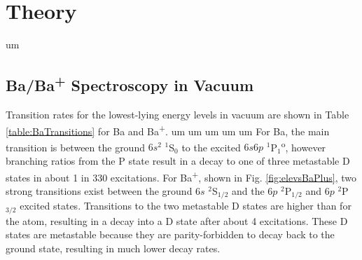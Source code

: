 \chapter{Theory}


um

\section{Ba/Ba\textsuperscript{+} Spectroscopy in Vacuum}


Transition rates for the lowest-lying energy levels in vacuum are shown in Table \ref{table:BaTransitions} for Ba and Ba\textsuperscript{+}.  um um um um um For Ba, the main transition is between the ground $6s^{2}$ $^{1}$S$_{0}$ to the excited $6s6p$ $^{1}$P$_{1}$\textsuperscript{o}, however branching ratios from the P state result in a decay to one of three metastable D states in about 1 in 330 excitations.  For Ba\textsuperscript{+}, shown in Fig. \ref{fig:elevsBaPlus}, two strong transitions exist between the ground $6s$ $^{2}$S$_{1/2}$ and the $6p$ $^{2}$P$_{1/2}$ and $6p$ $^{2}$P$_{3/2}$ excited states.  Transitions to the two metastable D states are higher than for the atom, resulting in a decay into a D state after about 4 excitations.  These D states are metastable because they are parity-forbidden to decay back to the ground state, resulting in much lower decay rates.


